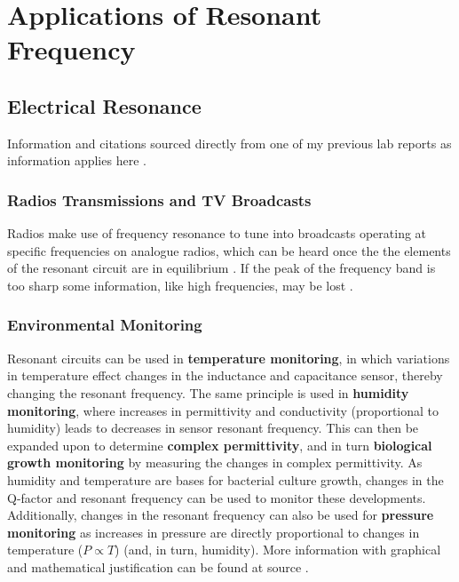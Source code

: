 \documentclass[12pt]{article}
\begin{document}
\newpage

\section{Applications of Resonant Frequency}

\subsection{Electrical Resonance}

Information and citations sourced directly from one of my previous lab reports as information applies here \cite{meUCDlcr}.

\subsubsection{Radios Transmissions and TV Broadcasts}

Radios make use of frequency resonance to tune into broadcasts operating at specific frequencies on analogue radios, which can be heard once the the elements of the resonant circuit are in equilibrium
\cite{radio}. 
If the peak of the frequency band is too sharp some information, like high frequencies, may be lost
\cite{UCDlcr}.

\subsubsection{Environmental Monitoring}

Resonant circuits can be used in \textbf{temperature monitoring}, in which variations in \break temperature effect changes in the inductance and capacitance sensor, thereby changing the resonant frequency.
The same principle is used in \textbf{humidity monitoring}, where increases in permittivity and conductivity (proportional to humidity) leads to decreases in sensor resonant 
frequency.
This can then be expanded upon to determine \textbf{complex permittivity}, and in turn \textbf{biological growth monitoring} by measuring the changes in complex permittivity.
As humidity and temperature are bases for bacterial culture growth, changes in the Q-factor and resonant frequency can be used to monitor these developments.
Additionally, changes in the resonant frequency can also be used for \textbf{pressure monitoring} as increases in pressure are directly proportional to changes in temperature ($P \propto T$) (and, in turn, humidity).
More information with graphical and mathematical justification can be found at source \cite{ONG200133}.
\end{document}
